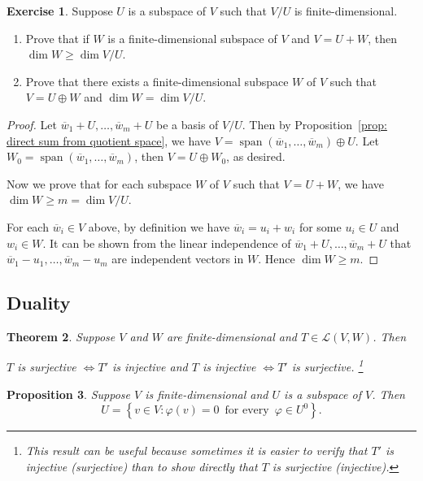 \documentclass{tufte-handout}
\theoremstyle{plain} %
\newtheorem{thm}{Theorem}
\newtheorem{prop}[thm]{Proposition}
\theoremstyle{definition}
\newtheorem{exer}[thm]{Exercise}
\theoremstyle{remark}
\newcommand{\bra}[1]{\mathopen{}\left(#1\right)}
\newcommand{\cbra}[1]{\mathopen{}\left\{#1\right\}}
\renewcommand{\phi}{\varphi}
\renewcommand{\L}{\mathcal{L}}
\DeclareMathOperator{\spn}{span}
\begin{document}
\begin{exer}
	Suppose $U$ is a subspace of $V$ such that $V/U$ is finite-dimensional.
	\begin{enumerate}
		\item Prove that if $W$ is a finite-dimensional subspace of $V$ and $V=U+W$, then $\dim W\geq\dim V/U$.
		\item Prove that there exists a finite-dimensional subspace $W$ of $V$ such that $V=U\oplus W$ and $\dim W=\dim V/U$.
	\end{enumerate}
\end{exer}
\begin{proof}
	Let $\overline{w}_1+U,\dots,\overline{w}_m+U$ be a basis of $V/U$. Then by Proposition~\ref{prop: direct sum from quotient space}, we have $V=\spn(\overline{w}_1,\dots,\overline{w}_m)\oplus U$. Let $W_0=\spn(\overline{w}_1,\dots,\overline{w}_m)$, then $V=U\oplus W_0$, as desired.

	Now we prove that for each subspace $W$ of $V$ such that $V=U+W$, we have $\dim W\geq m=\dim V/U$.
	
	For each $\overline{w}_i\in V$ above, by definition we have $\overline{w}_i=u_i+w_i$ for some $u_i\in U$ and $w_i\in W$. It can be shown from the linear independence of $\overline{w}_1+U,\dots,\overline{w}_m+U$ that $\overline{w}_1-u_1,\dots,\overline{w}_m-u_m$ are independent vectors in $W$. Hence $\dim W\geq m$.
\end{proof}


\subsection{Duality}
\begin{thm}
	Suppose $V$ and $W$ are finite-dimensional and $T\in\L\bra{V,W}$. Then
	\begin{center}
	$T$ is surjective $\iff T'$ is injective \quad and \quad $T$ is injective $\iff T'$ is surjective.%
    \footnote{This result can be useful because sometimes it is easier to verify that $T'$ is injective (surjective) than to show directly that $T$ is surjective (injective).}
	\end{center}
\end{thm}

\begin{prop}\label{prop: relation between subspace and annihilator}
	Suppose $V$ is finite-dimensional and $U$ is a subspace of $V$. Then
	\[U=\cbra{v\in V:\phi(v)=0\,\text{ for every }\,\phi\in U^0}.\]
\end{prop}
\end{document}
